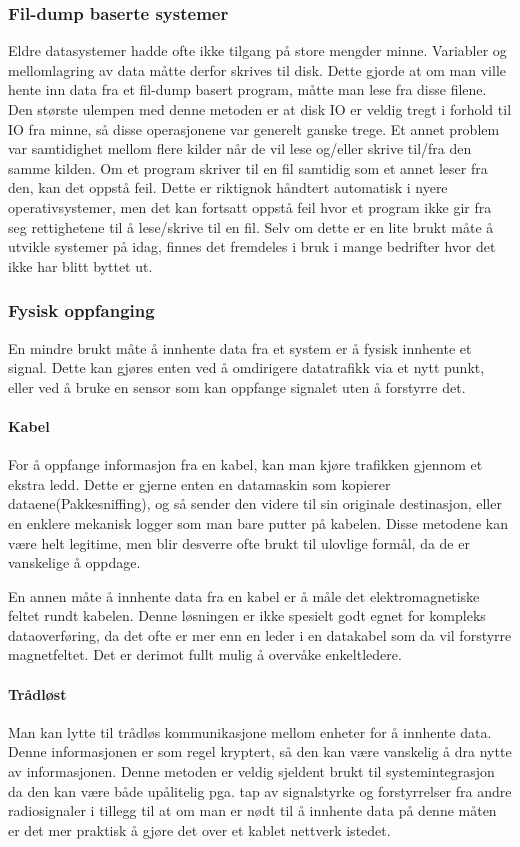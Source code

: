 \documentclass[../main.tex]{subfiles}
\begin{document}
\subsubsection{Fil-dump baserte systemer}
Eldre datasystemer hadde ofte ikke tilgang på store mengder minne. Variabler og mellomlagring av data måtte derfor skrives til disk. Dette gjorde at om man ville hente inn data fra et fil-dump basert program, måtte man lese fra disse filene. Den største ulempen med denne metoden er at disk IO er veldig tregt i forhold til IO fra minne, så disse operasjonene var generelt ganske trege. Et annet problem var samtidighet mellom flere kilder når de vil lese og/eller skrive til/fra den samme kilden. Om et program skriver til en fil samtidig som et annet leser fra den, kan det oppstå feil. Dette er riktignok håndtert automatisk i nyere operativsystemer, men det kan fortsatt oppstå feil hvor et program ikke gir fra seg rettighetene til å lese/skrive til en fil.
Selv om dette er en lite brukt måte å utvikle systemer på idag, finnes det fremdeles i bruk i mange bedrifter hvor det ikke har blitt byttet ut.

\subsubsection{Fysisk oppfanging}
En mindre brukt måte å innhente data fra et system er å fysisk innhente et signal. Dette kan gjøres enten ved å omdirigere datatrafikk via et nytt punkt, eller ved å bruke en sensor som kan oppfange signalet uten å forstyrre det.

\paragraph{Kabel}
For å oppfange informasjon fra en kabel, kan man kjøre trafikken gjennom et ekstra ledd. Dette er gjerne enten en datamaskin som kopierer dataene(Pakkesniffing), og så sender den videre til sin originale destinasjon, eller en enklere mekanisk logger som man bare putter på kabelen. Disse metodene kan være helt legitime, men blir desverre ofte brukt til ulovlige formål, da de er vanskelige å oppdage.

En annen måte å innhente data fra en kabel er å måle det elektromagnetiske feltet rundt kabelen. Denne løsningen er ikke spesielt godt egnet for kompleks dataoverføring, da det ofte er mer enn en leder i en datakabel som da vil forstyrre magnetfeltet. Det er derimot fullt mulig å overvåke enkeltledere.

\paragraph{Trådløst}
Man kan lytte til trådløs kommunikasjone mellom enheter for å innhente data. Denne informasjonen er som regel kryptert, så den kan være vanskelig å dra nytte av informasjonen. Denne metoden er veldig sjeldent brukt til systemintegrasjon da den kan være både upålitelig pga. tap av signalstyrke og forstyrrelser fra andre radiosignaler i tillegg til at om man er nødt til å innhente data på denne måten er det mer praktisk å gjøre det over et kablet nettverk istedet.
\end{document}

